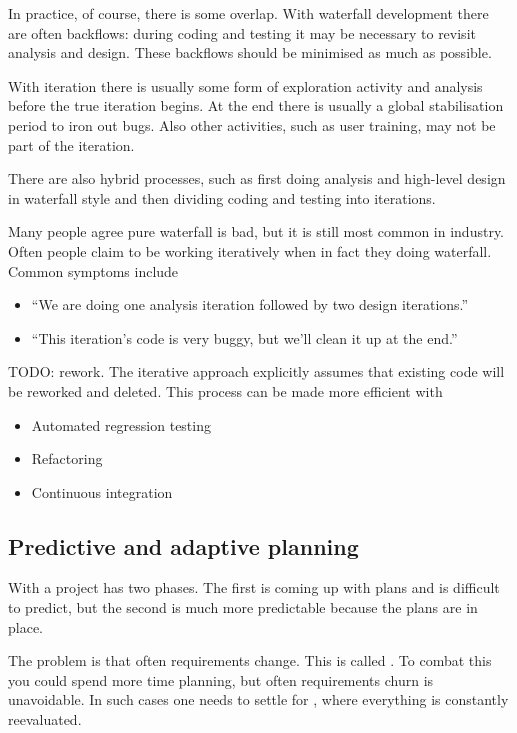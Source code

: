 In practice, of course, there is some overlap. With waterfall development there are often backflows: during coding and testing it may be necessary to revisit analysis and design. These backflows should be minimised as much as possible.

With iteration there is usually some form of exploration activity and analysis before the true iteration begins. At the end there is usually a global stabilisation period to iron out bugs. Also other activities, such as user training, may not be part of the iteration.

There are also hybrid processes, such as first doing analysis and high-level design in waterfall style and then dividing coding and testing into iterations.

\begin{params}
Many people agree pure waterfall is bad, but it is still most common in industry. Often people claim to be working iteratively when in fact they doing waterfall. Common symptoms include
\begin{itemize}
\item ``We are doing one analysis iteration followed by two design iterations.''
\item ``This iteration's code is very buggy, but we'll clean it up at the end.''
\end{itemize}
\end{params}

TODO: rework.
The iterative approach explicitly assumes that existing code will be reworked and deleted. This process can be made more efficient with
\begin{itemize}
\item Automated regression testing
\item Refactoring
\item Continuous integration
\end{itemize}

\subsection{Predictive and adaptive planning}
With  a project has two phases. The first is coming up with plans and is difficult to predict, but the second is much more predictable because the plans are in place. 

The problem is that often requirements change. This is called . To combat this you could spend more time planning, but often requirements churn is unavoidable. In such cases one needs to settle for , where everything is constantly reevaluated.

